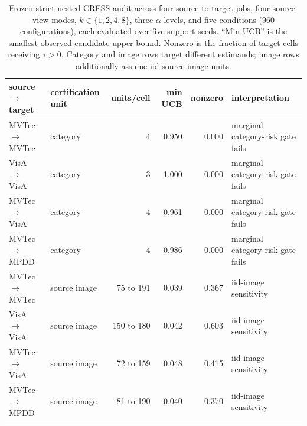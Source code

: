 \begin{table}[t]
\centering
\caption{Frozen strict nested CRESS audit across four source-to-target jobs, four source-view modes, $k\in\{1,2,4,8\}$, three $\alpha$ levels, and five conditions (960 configurations), each evaluated over five support seeds. ``Min UCB'' is the smallest observed candidate upper bound. Nonzero is the fraction of target cells receiving $\tau>0$. Category and image rows target different estimands; image rows additionally assume iid source-image units.}
\label{tab:strict-nested-sc3r}
\footnotesize
\setlength{\tabcolsep}{5pt}
\begin{tabular}{llrrrl}
\toprule
source $\rightarrow$ target & certification unit & units/cell & min UCB & nonzero & interpretation \\
\midrule
MVTec $\rightarrow$ MVTec & category & 4 & 0.950 & 0.000 & marginal category-risk gate fails \\
VisA $\rightarrow$ VisA & category & 3 & 1.000 & 0.000 & marginal category-risk gate fails \\
MVTec $\rightarrow$ VisA & category & 4 & 0.961 & 0.000 & marginal category-risk gate fails \\
MVTec $\rightarrow$ MPDD & category & 4 & 0.986 & 0.000 & marginal category-risk gate fails \\
\midrule
MVTec $\rightarrow$ MVTec & source image & 75 to 191 & 0.039 & 0.367 & iid-image sensitivity \\
VisA $\rightarrow$ VisA & source image & 150 to 180 & 0.042 & 0.603 & iid-image sensitivity \\
MVTec $\rightarrow$ VisA & source image & 72 to 159 & 0.048 & 0.415 & iid-image sensitivity \\
MVTec $\rightarrow$ MPDD & source image & 81 to 190 & 0.040 & 0.370 & iid-image sensitivity \\
\bottomrule
\end{tabular}
\end{table}
